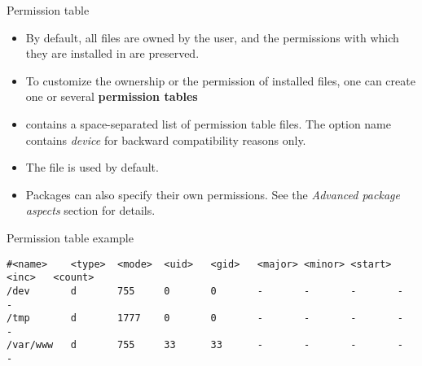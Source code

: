 \begin{frame}[fragile]{Permission table}
  \begin{itemize}
  \item By default, all files are owned by the  user, and
    the permissions with which they are installed in
     are preserved.
  \item To customize the ownership or the permission of installed
    files, one can create one or several {\bf permission tables}
  \item {} contains a space-separated list
    of permission table files. The option name contains {\em device}
    for backward compatibility reasons only.
  \item The  file is used by default.
  \item Packages can also specify their own permissions. See the {\em
      Advanced package aspects} section for details.
  \end{itemize}

\begin{block}{Permission table example}
{\tiny
\begin{verbatim}
#<name>    <type>  <mode>  <uid>   <gid>   <major> <minor> <start> <inc>   <count>
/dev       d       755     0       0       -       -       -       -       -
/tmp       d       1777    0       0       -       -       -       -       -
/var/www   d       755     33      33      -       -       -       -       -
\end{verbatim}
}
\end{block}

\end{frame}

